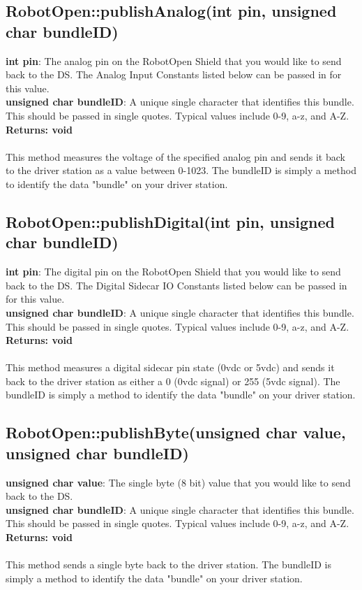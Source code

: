 \documentclass[11pt]{article} %
\begin{document}
\subsection{RobotOpen::publishAnalog(int pin, unsigned char bundleID)}
\textbf{int pin}: The analog pin on the RobotOpen Shield that you would like to send back to the DS. The Analog Input Constants listed below can be passed in for this value.\\
\textbf{unsigned char bundleID}: A unique single character that identifies this bundle. This should be passed in single quotes. Typical values include 0-9, a-z, and A-Z.\\
\textbf{Returns: void}\\\\
This method measures the voltage of the specified analog pin and sends it back to the driver station as a value between 0-1023. The bundleID is simply a method to identify the data "bundle" on your driver station.
\subsection{RobotOpen::publishDigital(int pin, unsigned char bundleID)}
\textbf{int pin}: The digital pin on the RobotOpen Shield that you would like to send back to the DS. The Digital Sidecar IO Constants listed below can be passed in for this value.\\
\textbf{unsigned char bundleID}: A unique single character that identifies this bundle. This should be passed in single quotes. Typical values include 0-9, a-z, and A-Z.\\
\textbf{Returns: void}\\\\
This method measures a digital sidecar pin state (0vdc or 5vdc) and sends it back to the driver station as either a 0 (0vdc signal) or 255 (5vdc signal). The bundleID is simply a method to identify the data "bundle" on your driver station.
\subsection{RobotOpen::publishByte(unsigned char value, unsigned char bundleID)}
\textbf{unsigned char value}: The single byte (8 bit) value that you would like to send back to the DS.\\
\textbf{unsigned char bundleID}: A unique single character that identifies this bundle. This should be passed in single quotes. Typical values include 0-9, a-z, and A-Z.\\
\textbf{Returns: void}\\\\
This method sends a single byte back to the driver station. The bundleID is simply a method to identify the data "bundle" on your driver station.
\end{document}

